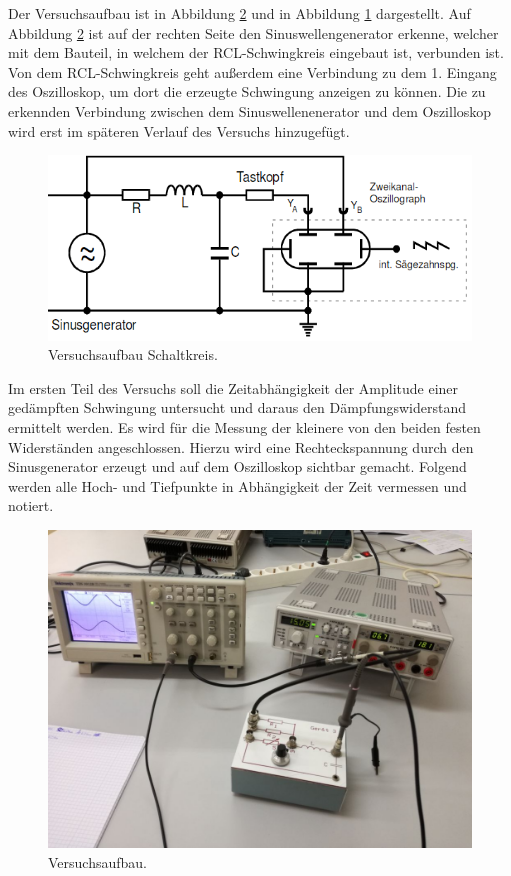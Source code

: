 Der Versuchsaufbau ist in Abbildung \ref{AufbauBild} und in Abbildung \ref{AufbauSchaltung} dargestellt. Auf Abbildung \ref{AufbauBild} ist auf der rechten
Seite den Sinuswellengenerator erkenne, welcher mit dem Bauteil, in welchem der RCL-Schwingkreis eingebaut ist, verbunden
ist. Von dem RCL-Schwingkreis geht außerdem eine Verbindung zu dem 1. Eingang des Oszilloskop, um dort die erzeugte Schwingung
anzeigen zu können. Die zu erkennden Verbindung zwischen dem Sinuswellenenerator und dem Oszilloskop wird erst im späteren Verlauf
des Versuchs hinzugefügt.
\begin{figure}[h]
  \centering
  \includegraphics[scale=0.4]{aufbau2.png}
  \caption{Versuchsaufbau Schaltkreis.}
  \label{AufbauSchaltung}
\end{figure}
Im ersten Teil des Versuchs soll die Zeitabhängigkeit der Amplitude einer gedämpften Schwingung untersucht und
daraus den Dämpfungswiderstand ermittelt werden. Es wird für die Messung der kleinere von den beiden festen Widerständen
angeschlossen. Hierzu wird eine Rechteckspannung durch den Sinusgenerator erzeugt
und auf dem Oszilloskop sichtbar gemacht. Folgend werden alle Hoch- und Tiefpunkte in Abhängigkeit der Zeit vermessen
und notiert.
\begin{figure}[h]
  \centering
  \includegraphics[scale=0.2]{V354Aufbau.jpeg}
  \caption{Versuchsaufbau.}
  \label{AufbauBild}
\end{figure}
